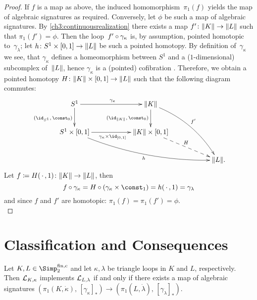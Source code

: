 \begin{proof}
    If $f$ is a map as above, the induced homomorphism~$\pi_1(f)$ yields
    the map of algebraic signatures as required. Conversely, let $\phi$
    be such a map of algebraic signatures. By \cref{ch3:continuousrealization}
    there exists a map $f'\colon\lVert K\rVert\to\lVert L\rVert$ such that $\pi_1(f')=\phi$.
    Then the loop~$f'\after\gamma_\kappa$ is, by assumption, pointed homotopic
    to~$\gamma_\lambda$; let $h\colon S^1\times[0,1]\to\lVert L\rVert$ be such a
    pointed homotopy. By definition of~$\gamma_\kappa$ we see, that
    $\gamma_\kappa$ defines a homeomorphism between $S^1$ and a
    ($1$-dimensional) subcomplex of~$\lVert L\rVert$, hence $\gamma_\kappa$
    is a (pointed) cofibration .
    Therefore, we obtain a pointed homotopy
    $H\colon\lVert K\rVert\times[0,1]\to\lVert L\rVert$ such that the following diagram
    commutes:
    \[
        \xymatrix@C=2cm{
            S^1
                \ar[r]^{\gamma_\kappa}
                \ar[d]_{(\id_{S^1},\,\const_0)}
            & \geom K
                \ar[d]_{(\id_{\geom K},\,\const_0)}
                \ar@/^1pc/[rdd]^{f'}
            \\
            S^1\times[0,1]
                \ar[r]_{\gamma_\kappa\times\id_{[0,1]}}
                \ar@/_1pc/[rrd]_h
            & \geom{K}\times[0,1]
                \ar@{-->}[rd]^H
            \\
            & & \geom L
            \rlap{.}
        }
    \]
    Let $f \coloneqq H(\,\cdot\,,1)\colon \lVert K\rVert\to \lVert L\rVert$, then
    \[ f\after\gamma_\kappa = H \after (\gamma_\kappa\times\const_1)
        = h(\scdot,1) = \gamma_\lambda
    \]
    and since $f$ and $f'$ are homotopic: $\pi_1(f) = \pi_1(f') = \phi$.
    \\
\end{proof}


\section{Classification and Consequences}
\label{ch2:sec:consequences}
%
\begingroup{}
\begin{thTheorem}
    \label{ch3:classification}
    Let $K,L\in\finSimp$ and let $\kappa,\lambda$ be triangle loops
    in $K$ and $L$, respectively.
    Then $\mathcal{L}_{K,\kappa}$ implements $\mathcal{L}_{L,\lambda}$ if and only if
    there exists a map of algebraic signatures
    $( \pi_1(K,\dot\kappa), \, [\gamma_\kappa]_\ast )
        \to ( \pi_1(L,\dot\lambda), \, [\gamma_\lambda]_\ast )$.
\end{thTheorem}
\endgroup

